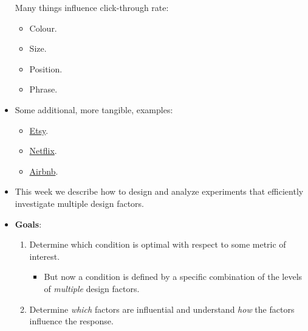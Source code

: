 \begin{itemize}
\begin{figure}[!htbp]
            \end{figure}

            Many things influence click-through rate:
            \begin{itemize}
                  \item Colour.
                  \item Size.
                  \item Position.
                  \item Phrase.
            \end{itemize}
      \item Some additional, more tangible, examples:
            \begin{itemize}
                  \item \href{https://goodui.org/leaks/how-etsys-product-page-design-evolved-between-2019-and-2020/}{Etsy}.
                  \item \href{https://goodui.org/leaks/netflix-a-b-tests-4-secondary-choices-all-of-which-get-rejected/}{Netflix}.
                  \item \href{https://goodui.org/leaks/airbnb-a-b-tests-and-rejects-a-natural-language-form/}{Airbnb}.
            \end{itemize}
      \item This week we describe how to design and analyze experiments that efficiently investigate multiple
            design factors.
      \item \textbf{Goals}:
            \begin{enumerate}[1.]
                  \item Determine which condition is optimal with respect to some metric of interest.
                        \begin{itemize}
                              \item But now a condition is defined by a specific combination of the levels of \emph{multiple} design factors.
                        \end{itemize}
                  \item Determine \emph{which} factors are influential and understand \emph{how} the factors influence the response.
            \end{enumerate}
\end{itemize}
